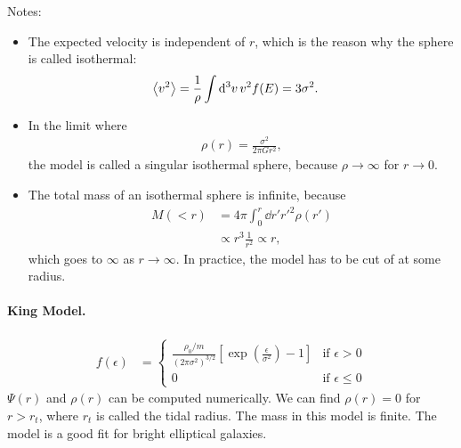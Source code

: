 Notes:
\begin{itemize}
	\item The expected velocity is independent of $r$, which is the reason why the sphere is called isothermal:
	\begin{align*}
		\left\langle v^2 \right\rangle
		&= \frac{1}{\rho} \int \dd{^3v} v^2 f(E)
		= 3 \sigma^2.
	\end{align*}
	\item In the limit where
	\begin{align*}
		\rho(r) = \frac{\sigma^2}{2 \pi G r^2},
	\end{align*}
	the model is called a singular isothermal sphere, because $\rho\to\infty$ for $r \to 0$.
	\item The total mass of an isothermal sphere is infinite, because
	\begin{align*}
		M(<r)
		&= 4 \pi \int_0^r \dd{r'} {r'}^2 \rho(r')\\
		&\propto r^3 \frac{1}{r^2} \propto r,
	\end{align*}
	which goes to $\infty$ as $r \to \infty$. In practice, the model has to be cut of at some radius.
\end{itemize}


\paragraph*{King Model.}
\begin{align*}
	f(\epsilon)
	&=
	\begin{cases}
		\frac{\rho_0/m}{(2 \pi \sigma^2)^{3/2}} \left[ \exp\left( \frac{\epsilon}{\sigma^2} \right) -1 \right]
		& \text{if } \epsilon > 0\\
		0
		& \text{if } \epsilon \leq 0
	\end{cases}
\end{align*}
$\Psi(r)$ and $\rho(r)$ can be computed numerically.
We can find $\rho(r) = 0$ for $r > r_t$, where $r_t$ is called the tidal radius.
The mass in this model is finite.
The model is a good fit for bright elliptical galaxies.


